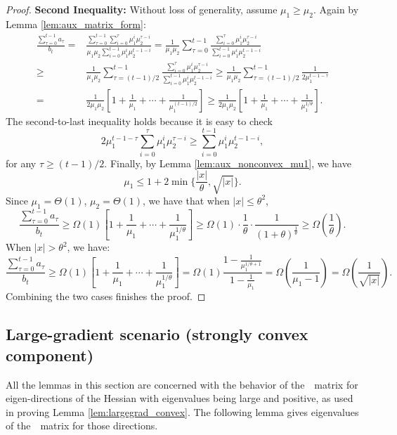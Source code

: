 \begin{proof}
\noindent \textbf{Second Inequality:}
Without loss of generality, assume $\mu_1 \ge \mu_2$. 
Again by Lemma \ref{lem:aux_matrix_form}:
\begin{align*}
\frac{\sum_{\tau = 0}^{t-1} a_\tau}{b_t}
=& \frac{\sum_{\tau = 0}^{t-1} \sum_{i=0}^{\tau} \mu_1^i \mu_2^{\tau-i}}
{\mu_1\mu_2\sum_{i=0}^{t-1} \mu_1^{i} \mu_2^{t-1-i}} 
= \frac{1}{\mu_1\mu_2}
\sum_{\tau = 0}^{t-1} \frac{\sum_{i=0}^{\tau} \mu_1^i \mu_2^{\tau-i}}
{\sum_{i=0}^{t-1} \mu_1^{i} \mu_2^{t-1-i}} \\
\ge & \frac{1}{\mu_1\mu_2}
\sum_{\tau = (t-1)/2}^{t-1} \frac{\sum_{i=0}^{\tau} \mu_1^i \mu_2^{\tau-i}}
{\sum_{i=0}^{t-1} \mu_1^{i} \mu_2^{t-1-i}} 
\ge  \frac{1}{\mu_1\mu_2} \sum_{\tau = (t-1)/2}^{t-1} \frac{1}{2 \mu_1^{t-1-\tau}} \\
= & \frac{1}{2\mu_1\mu_2} \left[1 + \frac{1}{\mu_1} + \cdots + \frac{1}{\mu_1^{(t-1)/2}}\right] 
\ge  \frac{1}{2\mu_1\mu_2} \left[1 + \frac{1}{\mu_1} + \cdots + \frac{1}{\mu_1^{1/\theta}}\right].
\end{align*}
The second-to-last inequality holds because it is easy to check
\begin{equation*}
2 \mu_1^{t-1-\tau}  \sum_{i=0}^{\tau} \mu_1^i \mu_2^{\tau-i} \ge \sum_{i=0}^{t-1} \mu_1^{i} \mu_2^{t-1-i},
\end{equation*}
for any $\tau \ge (t-1)/2$. Finally, by Lemma \ref{lem:aux_nonconvex_mu1}, we have
\begin{equation*}
\mu_1 \le 1 + 2\min \{\frac{|x|}{\theta}, \sqrt{|x|} \}.
\end{equation*}
Since $\mu_1 = \Theta(1)$, $\mu_2 = \Theta(1)$, we have that when $|x| \le \theta^2$, 
\begin{equation*}
\frac{\sum_{\tau = 0}^{t-1} a_\tau}{b_t} 
\ge \Omega(1) \left[1 + \frac{1}{\mu_1} + \cdots + \frac{1}{\mu_1^{1/\theta}}\right]
\ge \Omega(1) \cdot \frac{1}{\theta} \cdot \frac{1}{(1+\theta)^{\frac{1}{\theta}}}
\ge \Omega(\frac{1}{\theta}).
\end{equation*}
When $|x| > \theta^2$, we have:
\begin{equation*}
\frac{\sum_{\tau = 0}^{t-1} a_\tau}{b_t} 
\ge \Omega(1) \left[1 + \frac{1}{\mu_1} + \cdots + \frac{1}{\mu_1^{1/\theta}}\right]
= \Omega(1)
\frac{1 - \frac{1}{\mu_1^{1/\theta + 1}}}{1- \frac{1}{\mu_1}}
=\Omega(\frac{1}{\mu_1 - 1}) = \Omega(\frac{1}{\sqrt{|x|}}).
\end{equation*}
Combining the two cases finishes the proof.
\end{proof}

\subsection{Large-gradient scenario (strongly convex component)}
All the lemmas in this section are concerned with the behavior 
of the~\nag~matrix for eigen-directions of the Hessian with eigenvalues 
being large and positive, as used in proving Lemma \ref{lem:largegrad_convex}.
The following lemma gives eigenvalues of the~\nag~matrix for those directions.

